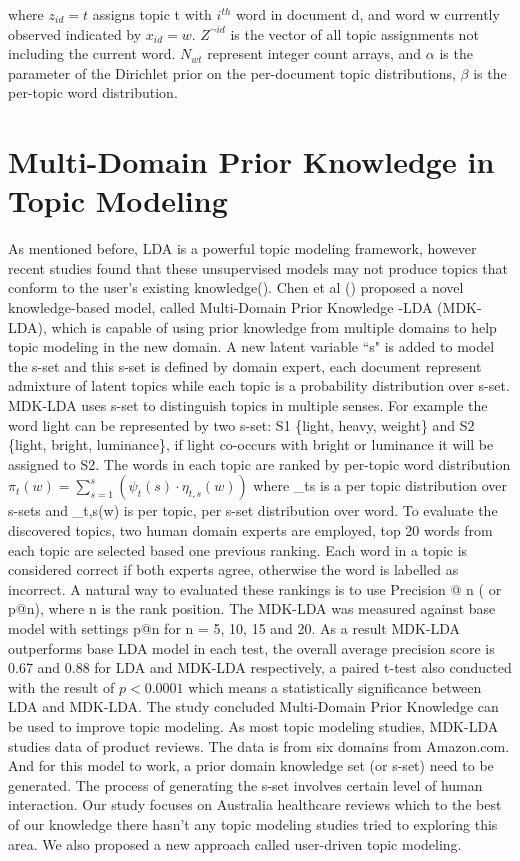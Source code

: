 \documentclass[11pt,twoside]{report}
\begin{document}
where $z_{id}=t$ assigns topic t with $i^{th}$ word in document d, and word w currently observed indicated by $x_{id}=w$.
$Z^{\neg id}$ is the vector of all topic assignments not including the current word. $N_{wt}$ represent integer count arrays, and $\alpha$ is the parameter of the Dirichlet prior on the per-document topic distributions, $\beta$ is the per-topic word distribution.

\section{Multi-Domain Prior Knowledge in Topic Modeling}
As mentioned before, LDA is a powerful topic modeling framework, however recent 
studies found that these unsupervised models may not produce topics that conform to 
the user's existing knowledge(\cite{ref24}). Chen et al (\cite{ref24}) proposed a 
novel knowledge-based model, called Multi-Domain Prior Knowledge -LDA (MDK-LDA), which is capable of using prior knowledge 
from multiple domains to help topic modeling in the new domain. 
A new latent variable ``s" is added to model the s-set and this s-set is defined by domain expert, each document represent 
admixture of latent topics while each topic is a probability distribution over s-set. 
MDK-LDA uses s-set to distinguish topics in multiple senses. 
For example the word light can be represented by two s-set: S1 \{light, heavy, weight\} and S2 \{light, bright, luminance\}, if light co-occurs with bright or 
luminance it will be assigned to S2.
The words in each topic are ranked by per-topic word distribution $\pi _{t}(w) = \sum_{s=1}^s (\psi_{t}(s)\cdot \eta_{t,s}(w) )$ where \psi_t{s} is a per topic distribution over s-sets and \eta_{t,s}(w) is per topic, per s-set distribution over word. To evaluate the discovered topics, two human domain experts are employed, top 20 words from each topic are selected based one previous ranking. Each word in a topic is considered correct if both experts agree, otherwise the word is labelled as incorrect. A natural way to evaluated these rankings is to use Precision @ n ( or p@n), where n is the rank position. The MDK-LDA was measured against base model with settings p@n for n = 5, 10, 15 and 20. As a result MDK-LDA outperforms base LDA model in each test, the overall average precision score is 0.67 and 0.88 for LDA and MDK-LDA respectively, a paired t-test also conducted with the result of $p < 0.0001$ which means a statistically significance  between LDA and MDK-LDA. The study concluded Multi-Domain Prior Knowledge can be used to improve topic modeling. 
As most topic modeling studies, MDK-LDA studies data of product reviews. The data is from six domains from Amazon.com. And for this model to work, a prior domain knowledge set (or s-set) need to be generated. The process of generating the s-set involves certain level of human interaction. Our study focuses on Australia healthcare reviews which to the best of our knowledge there hasn't any topic modeling studies tried to exploring this area. We also proposed a new approach called user-driven topic modeling.
\end{document}
